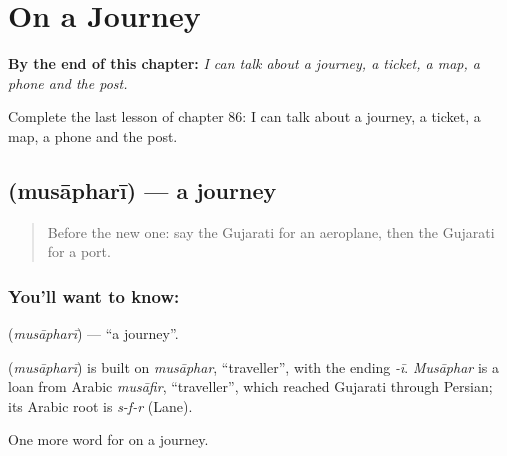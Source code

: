 
\chapter{On a Journey}
\label{ch:gu-on-a-journey}

\begin{chapteropening}
\textbf{By the end of this chapter:} \emph{I can talk about a journey, a ticket, a map, a phone and the post.}

Complete the last lesson of chapter 86: I can talk about a journey, a ticket, a map, a phone and the post.
\end{chapteropening}

\section[\texorpdfstring{\gu{મુસાફરી} (musāpharī)}{મુસાફરી (musāpharī)}]{ (musāpharī) — a journey}

\label{lesson:GU-C86-journey}



\begin{quote}
Before the new one: say the Gujarati for an aeroplane, then the Gujarati for a port.
\end{quote}

\subsection*{You'll want to know: }
\textbf{} (\emph{musāpharī}) — \textquotedblleft{}a journey\textquotedblright{}.

\begin{cousinweb}
\textbf{} (\emph{musāpharī}) is built on \emph{musāphar}, \textquotedblleft{}traveller\textquotedblright{}, with the ending \emph{-ī}. \emph{Musāphar} is a loan from Arabic \emph{musāfir}, \textquotedblleft{}traveller\textquotedblright{}, which reached Gujarati through Persian; its Arabic root is \emph{s-f-r} (Lane).
\end{cousinweb}

\begin{grammarlens}[title={What you've built}]
One more word for on a journey.
\end{grammarlens}

